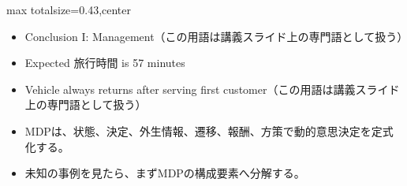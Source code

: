 \clearpage
{}
\begin{minipage}[t]{0.405\textwidth}
\begin{adjustbox}{max totalsize={\textwidth}{0.43\textheight},center}
\begin{minipage}{\textwidth}\scriptsize
{}\begin{itemize}
\item Conclusion I: Management（この用語は講義スライド上の専門語として扱う）
\item Expected 旅行時間 is 57 minutes
\item Vehicle always returns after serving first customer（この用語は講義スライド上の専門語として扱う）
\end{itemize}\begin{itemize}
\item MDPは、状態、決定、外生情報、遷移、報酬、方策で動的意思決定を定式化する。
\item 未知の事例を見たら、まずMDPの構成要素へ分解する。
\end{itemize}
\end{minipage}
\end{adjustbox}
\end{minipage}\hfill
